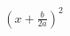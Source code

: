 \documentclass[preview]{standalone}
\begin{document}
\begin{align*}
\left( x + \frac{b}{2a} \right)^2
\end{align*}
\end{document}
